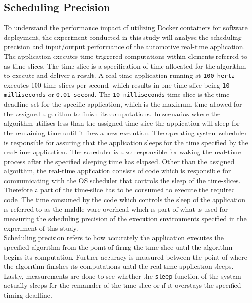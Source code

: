 \subsection{Scheduling Precision}
To understand the performance impact of utilizing Docker containers for software deployment, the experiment conducted in this study will analyse the scheduling precision and input/output performance of the automotive real-time application. The application executes time-triggered computations within elements referred to as time-slices. The time-slice is a specification of time allocated for the algorithm to execute and deliver a result. A real-time application running at \texttt{100 hertz} executes 100 time-slices per second, which results in one time-slice being \texttt{10 milliseconds} or \texttt{0.01 second}. The \texttt{10 milliseconds} time-slice is the time deadline set for the specific application, which is the maximum time allowed for the assigned algorithm to finish its computations. In scenarios where the algorithm utilises less than the assigned time-slice the application will sleep for the remaining time until it fires a new execution. The operating system scheduler is responsible for assuring that the application sleeps for the time specified by the real-time application. The scheduler is also responsible for waking the real-time process after the specified sleeping time has elapsed. Other than the assigned algorithm, the real-time application consists of code which is responsible for communicating with the OS scheduler that controls the sleep of the time-slices. Therefore a part of the time-slice has to be consumed to execute the required code. The time consumed by the code which controls the sleep of the application is referred to as the middle-ware overhead which is part of what is used for measuring the scheduling precision of the execution environments specified in the experiment of this study.\\

Scheduling precision refers to how accurately the application executes the specified algorithm from the point of firing the time-slice until the algorithm begins its computation. Further accuracy is measured between the point of where the algorithm finishes its computations until the real-time application sleeps. Lastly, measurements are done to see whether the \texttt{sleep} function of the system actually sleeps for the remainder of the time-slice or if it overstays the specified timing deadline.\\

